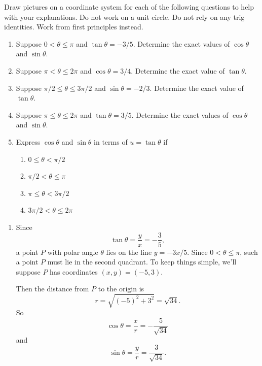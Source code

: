 \documentclass{ximera}
\begin{document}
\begin{question} \label{QmCMEIE}
Draw pictures on a coordinate system for each of the following questions to help with your explanations. Do not work on a unit circle. Do not rely on any trig identities. Work from first principles instead.

\begin{enumerate}
\item Suppose $0 < \theta \leq \pi$ and $\tan \theta = -3/5$. Determine the exact values of $\cos\theta$ and $\sin\theta$.

\item Suppose $\pi < \theta \leq 2\pi$ and $\cos\theta = 3/4$. Determine the exact value of $\tan \theta$.

\item Suppose $\pi/2 \leq  \theta \leq 3\pi/2$ and $\sin\theta = -2/3$. Determine the exact value of $\tan \theta$.

\item Suppose $\pi \leq  \theta \leq 2\pi$ and $\tan \theta = 3/5$. Determine the exact values of $\cos\theta$ and $\sin\theta$.

\item Express $\cos\theta$ and $\sin\theta$ in terms of $u=\tan \theta$ if

\begin{enumerate}
\item $0 \leq \theta < \pi/2$

\item $\pi/2 < \theta \leq  \pi$

\item $\pi \leq \theta < 3\pi/2$

\item $3\pi/2  < \theta \leq 2\pi$
\end{enumerate}
\end{enumerate}

\begin{enumerate}
\item Since
\[
  \tan\theta = \frac{y}{x} = -\frac{3}{5},
\]
a point $P$ with polar angle $\theta$ lies on the line $y=-3x/5$. Since $0 < \theta \leq \pi$, such a point $P$ must lie in the second quadrant. To keep things simple, we'll suppose $P$ has coordinates $(x,y) = (-5,3)$.

Then the distance from $P$ to the origin is
\[
     r = \sqrt{(-5)^2 + 3^2} = \sqrt{34}.   
\]
So
\[
  \cos\theta = \frac{x}{r} = -\frac{5}{\sqrt{34}}
\] 
and
\[
  \sin\theta = \frac{y}{r} = \frac{3}{\sqrt{34}}.
\]


\end{enumerate}
\end{question}
\end{document}
